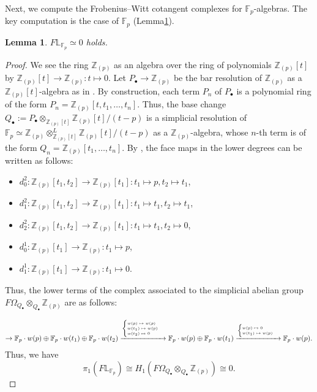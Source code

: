\documentclass[11pt, a4paper]{amsart}
\theoremstyle{plain}
\newtheorem{lemma}[theorem]{Lemma}
\theoremstyle{definition}
\begin{document}
Next, we compute the Frobenius--Witt cotangent complexes for $\mathbb F_p$-algebras. The key computation is the case of $\mathbb F_p$ (Lemma\ref{lem6.3}).

\begin{lemma}\label{lem6.3}
    $F\mathbb L_{\mathbb F_p}\simeq 0$ holds.
\end{lemma}
\begin{proof}
    We see the ring $\mathbb Z_{(p)}$ as an algebra over the ring of polynomials $\mathbb Z_{(p)}[t]$ by $\mathbb Z_{(p)}[t]\to \mathbb Z_{(p)}:t\mapsto 0$. Let $P_{\bullet}\to \mathbb Z_{(p)}$ be the bar resolution of $\mathbb Z_{(p)}$ as a $\mathbb Z_{(p)}[t]$-algebra as in \cite[Construction 4.13]{Iye07}. By construction, each term $P_n$ of $P_{\bullet}$ is a polynomial ring of the form $P_n=\mathbb Z_{(p)}[t,t_1,\dots,t_n]$. Thus, the base change $Q_{\bullet}:=P_{\bullet}\otimes_{\mathbb Z_{(p)}[t]}\mathbb Z_{(p)}[t]/(t-p)$ is a simplicial resolution of $\mathbb F_p\simeq \mathbb Z_{(p)}\otimes^L_{\mathbb Z_{(p)}[t]}\mathbb Z_{(p)}[t]/(t-p)$ as a $\mathbb Z_{(p)}$-algebra, whose $n$-th term is of the form $Q_n=\mathbb Z_{(p)}[t_1,\dots,t_n]$. By \cite[Construction 4.13]{Iye07}, the face maps in the lower degrees can be written as follows:\begin{itemize}
        \item $d^2_0:\mathbb Z_{(p)}[t_1,t_2]\to \mathbb Z_{(p)}[t_1]:t_1\mapsto p, t_2\mapsto t_1$,
        \item $d^2_1:\mathbb Z_{(p)}[t_1,t_2]\to \mathbb Z_{(p)}[t_1]:t_1\mapsto t_1, t_2\mapsto t_1$,
        \item $d^2_2:\mathbb Z_{(p)}[t_1,t_2]\to \mathbb Z_{(p)}[t_1]:t_1\mapsto t_1, t_2\mapsto 0$,
        \item $d^1_0:\mathbb Z_{(p)}[t_1]\to \mathbb Z_{(p)}:t_1\mapsto p$,
        \item $d^1_1:\mathbb Z_{(p)}[t_1]\to \mathbb Z_{(p)}:t_1\mapsto 0$.
    \end{itemize}
    Thus, the lower terms of the complex associated to the simplicial abelian group $F\Omega_{Q_{\bullet}}\otimes_{Q_{\bullet}}\mathbb Z_{(p)}$ are as follows:

    \begin{align*}    
    \to \mathbb F_p\cdot w(p)\oplus \mathbb F_p\cdot w(t_1)\oplus \mathbb F_p\cdot w(t_2)\xrightarrow[]{\tiny{\begin{cases} w(p)\mapsto w(p)\\w(t_1)\mapsto w(p)\\w(t_2)\mapsto 0\end{cases}}}\mathbb F_p\cdot w(p)\oplus \mathbb F_p\cdot w(t_1)\xrightarrow[]{\tiny{\begin{cases}w(p)\mapsto 0\\w(t_1)\mapsto w(p)\end{cases}}}\mathbb F_p\cdot w(p).
    \end{align*}
    Thus, we have \[\pi_1(F\mathbb L_{\mathbb F_p})\cong H_1(F\Omega_{Q_{\bullet}}\otimes_{Q_{\bullet}}\mathbb Z_{(p)})\cong 0.\]


\end{proof}
\end{document}
